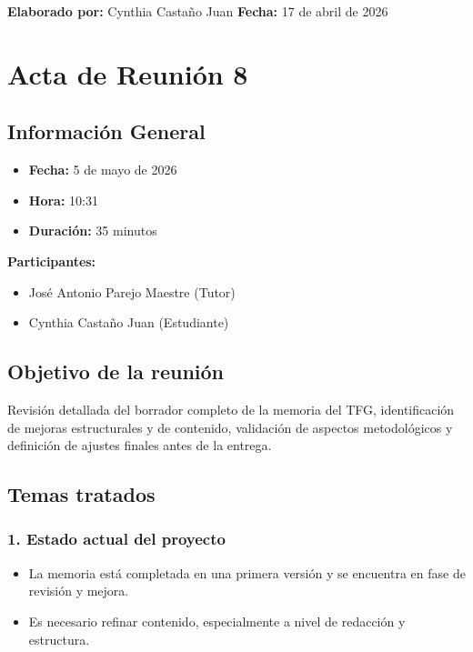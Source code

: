 \textbf{Elaborado por:} Cynthia Castaño Juan \hfill \textbf{Fecha:} 17 de abril de 2026

\newpage

\section*{Acta de Reunión 8}

\subsection*{Información General}
\begin{itemize}
    \item \textbf{Fecha:} 5 de mayo de 2026
    \item \textbf{Hora:} 10:31
    \item \textbf{Duración:} 35 minutos
\end{itemize}

\textbf{Participantes:}
\begin{itemize}
    \item José Antonio Parejo Maestre (Tutor)
    \item Cynthia Castaño Juan (Estudiante)
\end{itemize}

\subsection*{Objetivo de la reunión}
Revisión detallada del borrador completo de la memoria del TFG, identificación de mejoras estructurales y de contenido, validación de aspectos metodológicos y definición de ajustes finales antes de la entrega.

\subsection*{Temas tratados}

\subsubsection*{1. Estado actual del proyecto}
\begin{itemize}
    \item La memoria está completada en una primera versión y se encuentra en fase de revisión y mejora.
    \item Es necesario refinar contenido, especialmente a nivel de redacción y estructura.
\end{itemize}


